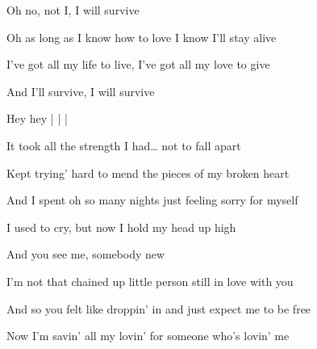 \begin{song}
\begin{chorusbox}{\PrechorusAndChorus}
\bigskip

Oh no, not I, I will survive \par
Oh as long as I know how to love I know I'll stay alive \par
I've got all my life to live, I've got all my love to give \par
And I'll survive, I will survive \par

\bigskip

Hey hey  |   |   |   \par
\end{chorusbox}

\bigskip

It took all the strength I had… not to fall apart \par
Kept trying' hard to mend the pieces of my broken heart \par
And I spent oh so many nights just feeling sorry for myself \par
I used to cry, but now I hold my head up high \par

\bigskip

And you see me, somebody new \par
I'm not that chained up little person still in love with you \par
And so you felt like droppin' in and just expect me to be free \par
Now I'm savin' all my lovin' for someone who's lovin' me \par

\bigskip

\PrechorusAndChorus

\bigskip

 \par

\end{song}